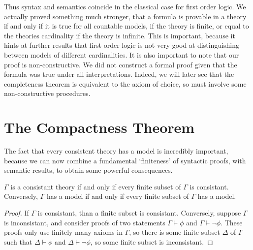 Thus syntax and semantics coincide in the classical case for first order logic. We actually proved something much stronger, that a formula is provable in a theory if and only if it is true for all countable models, if the theory is finite, or equal to the theories cardinality if the theory is infinite. This is important, because it hints at further results that first order logic is not very good at distinguishing between models of different cardinalities. It is also important to note that our proof is non-constructive. We did not construct a formal proof given that the formula was true under all interpretations. Indeed, we will later see that the completeness theorem is equivalent to the axiom of choice, so must involve some non-constructive procedures.

\section{The Compactness Theorem}

The fact that every consistent theory has a model is incredibly important, because we can now combine a fundamental `finiteness' of syntactic proofs, with semantic results, to obtain some powerful consequences.

\begin{theorem}
    $\Gamma$ is a consistant theory if and only if every finite subset of $\Gamma$ is consistant. Conversely, $\Gamma$ has a model if and only if every finite subset of $\Gamma$ has a model.
\end{theorem}
\begin{proof}
    If $\Gamma$ is consistant, than a finite subset is consistant. Conversely, suppose $\Gamma$ is inconsistant, and consider proofs of two statements $\Gamma \vdash \phi$ and $\Gamma \vdash \neg \phi$. These proofs only use finitely many axioms in $\Gamma$, so there is some finite subset $\Delta$ of $\Gamma$ such that $\Delta \vdash \phi$ and $\Delta \vdash \neg \phi$, so some finite subset is inconsistant.
\end{proof}

